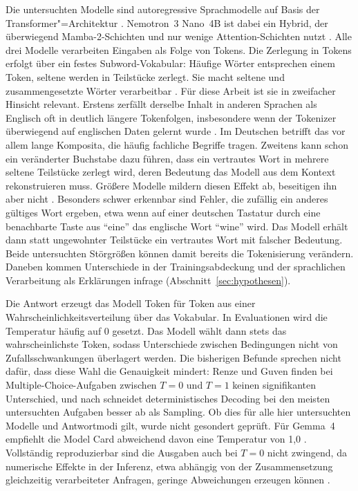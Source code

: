 \documentclass[a4paper,titlepage]{article}
\numberwithin{equation}{section} %
\begin{document}
Die untersuchten Modelle sind autoregressive Sprachmodelle auf Basis der Transformer"=Architektur \citep{vaswani_attention_2023}. Nemotron~3 Nano~4B ist dabei ein Hybrid, der überwiegend Mamba-2-Schichten und nur wenige Attention-Schichten nutzt \citep{noauthor_nvidianvidia-nemotron-3-nano-4b-bf16_2026}. Alle drei Modelle verarbeiten Eingaben als Folge von Tokens. Die Zerlegung in Tokens erfolgt über ein festes Subword-Vokabular: Häufige Wörter entsprechen einem Token, seltene werden in Teilstücke zerlegt. Sie macht seltene und zusammengesetzte Wörter verarbeitbar \citep{sennrich_neural_2016}. Für diese Arbeit ist sie in zweifacher Hinsicht relevant. Erstens zerfällt derselbe Inhalt in anderen Sprachen als Englisch oft in deutlich längere Tokenfolgen, insbesondere wenn der Tokenizer überwiegend auf englischen Daten gelernt wurde \citep{petrov_language_2023}. Im Deutschen betrifft das vor allem lange Komposita, die häufig fachliche Begriffe tragen. Zweitens kann schon ein veränderter Buchstabe dazu führen, dass ein vertrautes Wort in mehrere seltene Teilstücke zerlegt wird, deren Bedeutung das Modell aus dem Kontext rekonstruieren muss. Größere Modelle mildern diesen Effekt ab, beseitigen ihn aber nicht \citep{chai_tokenization_2024}. Besonders schwer erkennbar sind Fehler, die zufällig ein anderes gültiges Wort ergeben, etwa wenn auf einer deutschen Tastatur durch eine benachbarte Taste aus "`eine"' das englische Wort "`wine"' wird. Das Modell erhält dann statt ungewohnter Teilstücke ein vertrautes Wort mit falscher Bedeutung. Beide untersuchten Störgrößen können damit bereits die Tokenisierung verändern. Daneben kommen Unterschiede in der Trainingsabdeckung und der sprachlichen Verarbeitung als Erklärungen infrage (Abschnitt~\ref{sec:hypothesen}).

Die Antwort erzeugt das Modell Token für Token aus einer Wahrscheinlichkeitsverteilung über das Vokabular. In Evaluationen wird die Temperatur häufig auf 0 gesetzt. Das Modell wählt dann stets das wahrscheinlichste Token, sodass Unterschiede zwischen Bedingungen nicht von Zufallsschwankungen überlagert werden. Die bisherigen Befunde sprechen nicht dafür, dass diese Wahl die Genauigkeit mindert: Renze und Guven \citeyearpar{renze_effect_2024} finden bei Multiple-Choice-Aufgaben zwischen $T = 0$ und $T = 1$ keinen signifikanten Unterschied, und nach \citet{song_good_2025} schneidet deterministisches Decoding bei den meisten untersuchten Aufgaben besser ab als Sampling. Ob dies für alle hier untersuchten Modelle und Antwortmodi gilt, wurde nicht gesondert geprüft. Für Gemma~4 empfiehlt die Model Card abweichend davon eine Temperatur von 1,0 \citep{deepmind_gemma_nodate}. Vollständig reproduzierbar sind die Ausgaben auch bei $T = 0$ nicht zwingend, da numerische Effekte in der Inferenz, etwa abhängig von der Zusammensetzung gleichzeitig verarbeiteter Anfragen, geringe Abweichungen erzeugen können \citep{lab_defeating_nodate}.
\end{document}
